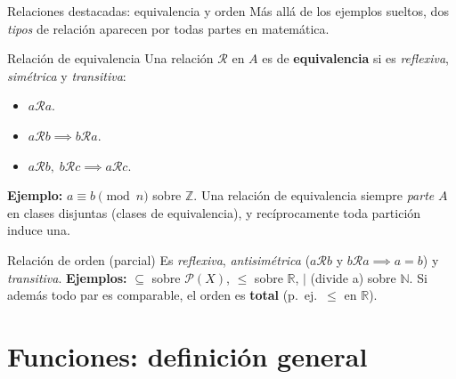 \documentclass[10pt,xcolor=dvipsnames]{beamer}
\begin{document}
\begin{frame}{Relaciones destacadas: equivalencia y orden}
  Más allá de los ejemplos sueltos, dos \emph{tipos} de relación
  aparecen por todas partes en matemática.

  \begin{block}{Relación de equivalencia}
    Una relación $\mathcal{R}$ en $A$ es de \textbf{equivalencia} si es
    \emph{reflexiva}, \emph{simétrica} y \emph{transitiva}:
    \begin{itemize}
      \item $a \mathbin{\mathcal{R}} a$.
      \item $a \mathbin{\mathcal{R}} b \implies b \mathbin{\mathcal{R}} a$.
      \item $a \mathbin{\mathcal{R}} b,\; b \mathbin{\mathcal{R}} c \implies a \mathbin{\mathcal{R}} c$.
    \end{itemize}
    \textbf{Ejemplo:} $a \equiv b \pmod{n}$ sobre $\mathbb{Z}$. Una relación
    de equivalencia siempre \emph{parte} $A$ en clases disjuntas
    (clases de equivalencia), y recíprocamente toda partición induce una.
  \end{block}

  \begin{block}{Relación de orden (parcial)}
    Es \emph{reflexiva}, \emph{antisimétrica} ($a \mathbin{\mathcal{R}} b$ y
    $b \mathbin{\mathcal{R}} a \implies a = b$) y \emph{transitiva}.
    \textbf{Ejemplos:} $\subseteq$ sobre $\mathcal{P}(X)$, $\leq$ sobre
    $\mathbb{R}$, $\mid$ (divide a) sobre $\mathbb{N}$. Si además todo par
    es comparable, el orden es \textbf{total} (p.\ ej.\ $\leq$ en $\mathbb{R}$).
  \end{block}
\end{frame}





\section{Funciones: definición general}
\end{document}
